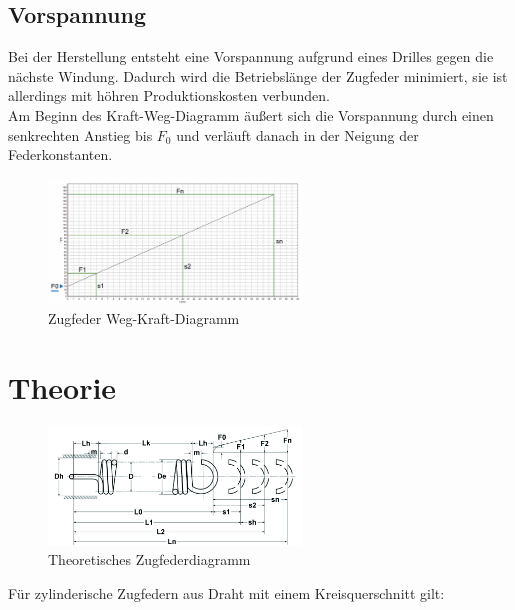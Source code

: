 \subsection{Vorspannung}
Bei der Herstellung entsteht eine Vorspannung aufgrund eines Drilles gegen die nächste
Windung. Dadurch wird die Betriebslänge der Zugfeder minimiert, sie ist allerdings mit höhren Produktionskosten
verbunden.\\
Am Beginn des Kraft-Weg-Diagramm äußert sich die Vorspannung durch einen senkrechten Anstieg
bis $F_0$ und verläuft danach in der Neigung der Federkonstanten.  
\begin{figure}[H]
    \centering
    \includegraphics[width=0.6\textwidth]{bilder/Input/Vorspannung.jpg}
    \caption{Zugfeder Weg-Kraft-Diagramm \cite{KompZ}}
\end{figure}




















\newpage
\section{Theorie}
\begin{figure}[H]
    \centering
    \includegraphics[width=0.6\textwidth]{bilder/Input/Zugfeder_technisch.jpg}
    \caption{Theoretisches Zugfederdiagramm \cite{AusM2}}
\end{figure}
Für zylinderische Zugfedern aus Draht mit einem Kreisquerschnitt gilt:\\\\

